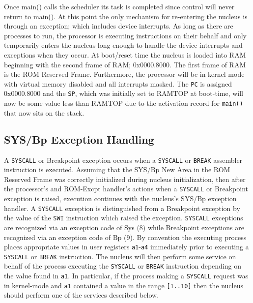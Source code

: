 Once main() calls the scheduler its task is completed since control will never
return to main(). At this point the only mechanism for re-entering the nucleus
is through an exception; which includes device interrupts. As long as there are
processes to run, the processor is executing instructions on their behalf and only
temporarily enters the nucleus long enough to handle the device interrupts and
exceptions when they occur.
At boot/reset time the nucleus is loaded into RAM beginning with the second frame of RAM; 
0x0000.8000. The first frame of RAM is the ROM Reserved
Frame. Furthermore, the processor will be in
kernel-mode with virtual memory disabled and all interrupts masked. 
The \verb+PC+ is assigned 0x0000.8000 and the \verb+SP+, which
was initially set to RAMTOP at boot-time, will now be some value less than
RAMTOP due to the activation record for \verb+main()+ that now sits on the stack.
\subsection{SYS/Bp Exception Handling}
A \verb+SYSCALL+ or Breakpoint exception occurs when a \verb+SYSCALL+ or
\verb+BREAK+ assembler instruction is executed. Assuming that the SYS/Bp New Area in the ROM
Reserved Frame was correctly initialized during nucleus initialization, then after
the processor's and ROM-Excpt handler's actions when a \verb+SYSCALL+ or Breakpoint exception is raised, execution continues with the nucleus's SYS/Bp exception handler.
A \verb+SYSCALL+ exception is distinguished from a Breakpoint exception by the
value of the \verb+SWI+ instruction which raised the exception.
\verb+SYSCALL+ exceptions
are recognized via an exception code of Sys (8) while Breakpoint exceptions are
recognized via an exception code of Bp (9).
By convention the executing process places appropriate values in user registers
\verb+a1+-\verb+a4+ immediately prior to executing a \verb+SYSCALL+ or
\verb+BREAK+ instruction. The
nucleus will then perform some service on behalf of the process executing the
\verb+SYSCALL+ or \verb+BREAK+ instruction depending on the value found in \verb+a1+.
In particular, if the process making a \verb+SYSCALL+ request was in kernel-mode
and \verb+a1+ contained a value in the range \verb+[1..10]+ then the nucleus should 
perform one of the services described below.
